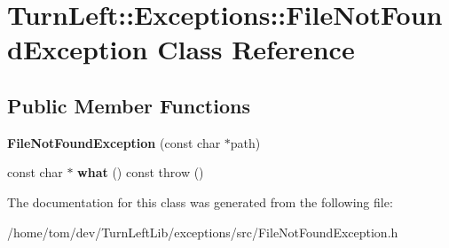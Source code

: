 \hypertarget{classTurnLeft_1_1Exceptions_1_1FileNotFoundException}{
\section{TurnLeft::Exceptions::FileNotFoundException Class Reference}
\label{classTurnLeft_1_1Exceptions_1_1FileNotFoundException}
}
\subsection*{Public Member Functions}
\begin{DoxyCompactItemize}
\item 
\hypertarget{classTurnLeft_1_1Exceptions_1_1FileNotFoundException_a8b2a077fa8d41f2d1a79ebe556ddd4c2}{
{\bfseries FileNotFoundException} (const char $\ast$path)}
\label{classTurnLeft_1_1Exceptions_1_1FileNotFoundException_a8b2a077fa8d41f2d1a79ebe556ddd4c2}

\item 
\hypertarget{classTurnLeft_1_1Exceptions_1_1FileNotFoundException_a8834fdcccd37f53b966df459d1884247}{
const char $\ast$ {\bfseries what} () const   throw ()}
\label{classTurnLeft_1_1Exceptions_1_1FileNotFoundException_a8834fdcccd37f53b966df459d1884247}

\end{DoxyCompactItemize}


The documentation for this class was generated from the following file:\begin{DoxyCompactItemize}
\item 
/home/tom/dev/TurnLeftLib/exceptions/src/FileNotFoundException.h\end{DoxyCompactItemize}
